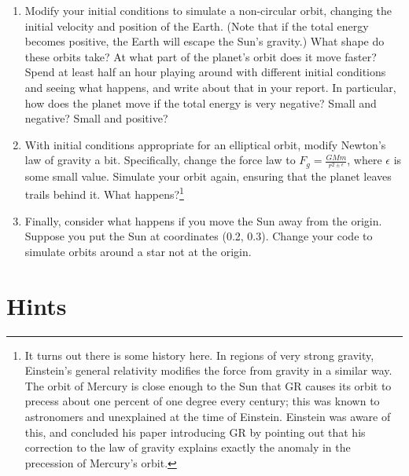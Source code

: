 \documentclass[12pt]{article}
\begin{document}
\begin{enumerate}
\item{Modify your initial conditions to simulate a non-circular orbit, changing the initial velocity and position of the Earth. (Note that if the total energy becomes positive, the Earth will escape the Sun's gravity.) What shape do these orbits take? At what part of the planet's orbit does it move faster? Spend at 
least half an hour playing around with different initial conditions and seeing
what happens, and write about that in your report. In particular, how does the planet move if the total energy is very negative? Small and negative? Small and positive?}

\item With initial conditions appropriate for an elliptical orbit, modify Newton's law of gravity a bit. Specifically, change the force law to $F_g = \frac{GMm}{r^{2 \pm \epsilon}}$, where $\epsilon$ is some small value. Simulate your orbit again, ensuring that the planet leaves trails behind it. What happens?\footnote{
It turns out there is some history here. In regions of very strong gravity, Einstein's general relativity modifies the force from gravity in a similar way. The orbit of 
Mercury is close enough to the Sun that GR causes its orbit to precess about one percent of one degree every century; this was known to astronomers and unexplained at the
time of Einstein. Einstein was aware of this, and concluded his paper introducing GR by pointing out that his correction to the law of gravity explains exactly the 
anomaly in the precession of Mercury's orbit.}



\item{Finally, consider what happens if you move the Sun away from the origin. Suppose you put the Sun at coordinates (0.2, 0.3). Change your code to simulate orbits around a star not at the origin.}

\end{enumerate}
\newpage
\section{Hints}
\end{document}
